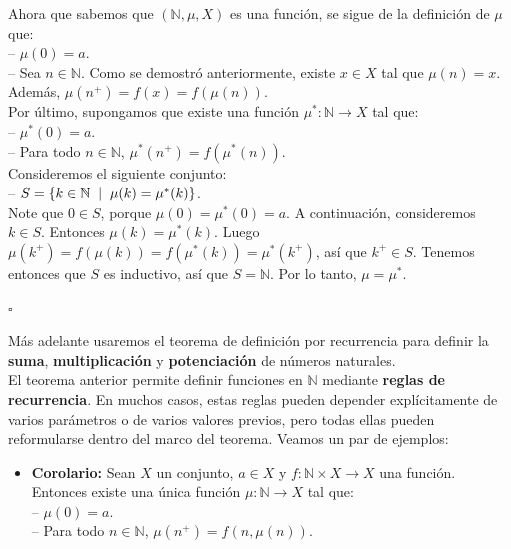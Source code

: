 \documentclass[10 pt]{article}
\begin{document}
\Large{Ahora que sabemos que $(\mathbb N,\mu,X)$ es una función, se sigue de la definición de $\mu$ que: \\

-- $\mu(0)=a$. \\

-- Sea $n \in \mathbb N$. Como se demostró anteriormente, existe $x \in X$ tal que $\mu(n)=x$. Además, $\mu(n^+)=f(x)=f(\mu(n))$. \\

Por último, supongamos que existe una función $\mu^*: \mathbb N \rightarrow X$ tal que: \\

-- $\mu^*(0)=a$. \\

-- Para todo $n \in \mathbb N$, $\mu^*(n^+)=f(\mu^*(n))$. \\

Consideremos el siguiente conjunto: \\

-- $S=\{k \in \mathbb N \hspace{0.2 cm}|\hspace{0.2 cm}\mu(k)=\mu^*(k)\}$. \\

Note que $0 \in S$, porque $\mu(0)=\mu^*(0)=a$. A continuación, consideremos $k \in S$. Entonces $\mu(k)=\mu^*(k)$. Luego $\mu(k^+)=f(\mu(k))=f(\mu^*(k))=\mu^*(k^+)$, así que $k^+ \in S$. Tenemos entonces que $S$ es inductivo, así que $S=\mathbb N$. Por lo tanto, $\mu=\mu^*$.} \\

\begin{flushright}
    $\square$
\end{flushright}

\Large{Más adelante usaremos el teorema de definición por recurrencia para definir la \textbf{suma}, \textbf{multiplicación} y \textbf{potenciación} de números naturales.} \\

\Large{El teorema anterior permite definir funciones en $\mathbb N$  mediante \textbf{reglas de recurrencia}. En muchos casos, estas reglas pueden depender explícitamente de varios parámetros o de varios valores previos, pero todas ellas pueden reformularse dentro del marco del teorema. Veamos un par de ejemplos:} \\

\begin{itemize}
    \item \Large{\textbf{Corolario:} Sean $X$ un conjunto, $a \in X$ y $f:\mathbb N \times X \rightarrow X$ una función. Entonces existe una única función $\mu:\mathbb N \rightarrow X$ tal que: \\

    -- $\mu(0)=a$. \\

    -- Para todo $n \in \mathbb N$, $\mu(n^+)=f(n,\mu(n))$.} \\
\end{itemize}
\end{document}
